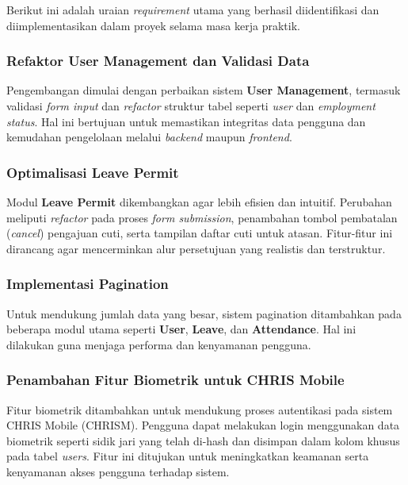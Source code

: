 Berikut ini adalah uraian \textit{requirement} utama yang berhasil diidentifikasi dan diimplementasikan dalam proyek selama masa kerja praktik.
\subsubsection{Refaktor User Management dan Validasi Data}

Pengembangan dimulai dengan perbaikan sistem \textbf{User Management}, termasuk validasi \textit{form input} dan \textit{refactor} struktur tabel seperti \textit{user} dan \textit{employment status}. Hal ini bertujuan untuk memastikan integritas data pengguna dan kemudahan pengelolaan melalui \textit{backend} maupun \textit{frontend}.
\subsubsection{Optimalisasi Leave Permit}

Modul \textbf{Leave Permit} dikembangkan agar lebih efisien dan intuitif. Perubahan meliputi \textit{refactor} pada proses \textit{form submission}, penambahan tombol pembatalan (\textit{cancel}) pengajuan cuti, serta tampilan daftar cuti untuk atasan. Fitur-fitur ini dirancang agar mencerminkan alur persetujuan yang realistis dan terstruktur.
\subsubsection{Implementasi Pagination}

Untuk mendukung jumlah data yang besar, sistem pagination ditambahkan pada beberapa modul utama seperti \textbf{User}, \textbf{Leave}, dan \textbf{Attendance}. Hal ini dilakukan guna menjaga performa dan kenyamanan pengguna.
\subsubsection{Penambahan Fitur Biometrik untuk CHRIS Mobile}

Fitur biometrik ditambahkan untuk mendukung proses autentikasi pada sistem CHRIS Mobile (CHRISM). Pengguna dapat melakukan login menggunakan data biometrik seperti sidik jari yang telah di-hash dan disimpan dalam kolom khusus pada tabel \textit{users}. Fitur ini ditujukan untuk meningkatkan keamanan serta kenyamanan akses pengguna terhadap sistem.

